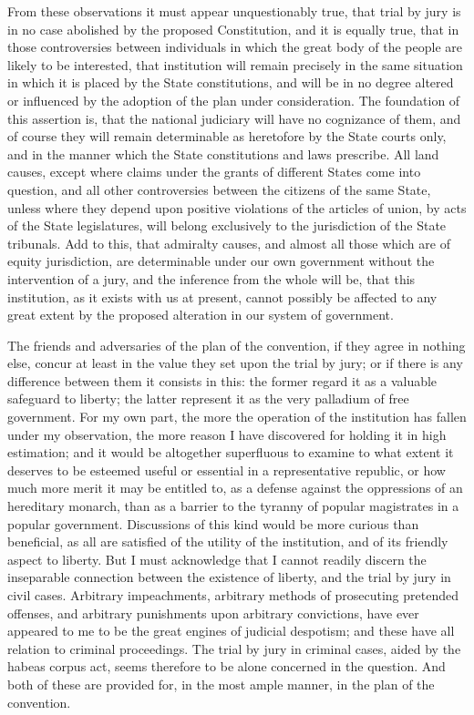 From these observations it must appear unquestionably true, that trial by jury is in no case abolished by the proposed Constitution, and it is equally true, that in those controversies between individuals in which the great body of the people are likely to be interested, that institution will remain precisely in the same situation in which it is placed by the State constitutions, and will be in no degree altered or influenced by the adoption of the plan under consideration. 
The foundation of this assertion is, that the national judiciary will have no cognizance of them, and of course they will remain determinable as heretofore by the State courts only, and in the manner which the State constitutions and laws prescribe. 
All land causes, except where claims under the grants of different States come into question, and all other controversies between the citizens of the same State, unless where they depend upon positive violations of the articles of union, by acts of the State legislatures, will belong exclusively to the jurisdiction of the State tribunals. 
Add to this, that admiralty causes, and almost all those which are of equity jurisdiction, are determinable under our own government without the intervention of a jury, and the inference from the whole will be, that this institution, as it exists with us at present, cannot possibly be affected to any great extent by the proposed alteration in our system of government.

The friends and adversaries of the plan of the convention, if they agree in nothing else, concur at least in the value they set upon the trial by jury; or if there is any difference between them it consists in this: the former regard it as a valuable safeguard to liberty; the latter represent it as the very palladium of free government. 
For my own part, the more the operation of the institution has fallen under my observation, the more reason I have discovered for holding it in high estimation; and it would be altogether superfluous to examine to what extent it deserves to be esteemed useful or essential in a representative republic, or how much more merit it may be entitled to, as a defense against the oppressions of an hereditary monarch, than as a barrier to the tyranny of popular magistrates in a popular government. 
Discussions of this kind would be more curious than beneficial, as all are satisfied of the utility of the institution, and of its friendly aspect to liberty. 
But I must acknowledge that I cannot readily discern the inseparable connection between the existence of liberty, and the trial by jury in civil cases. 
Arbitrary impeachments, arbitrary methods of prosecuting pretended offenses, and arbitrary punishments upon arbitrary convictions, have ever appeared to me to be the great engines of judicial despotism; and these have all relation to criminal proceedings. 
The trial by jury in criminal cases, aided by the habeas corpus act, seems therefore to be alone concerned in the question. 
And both of these are provided for, in the most ample manner, in the plan of the convention.

